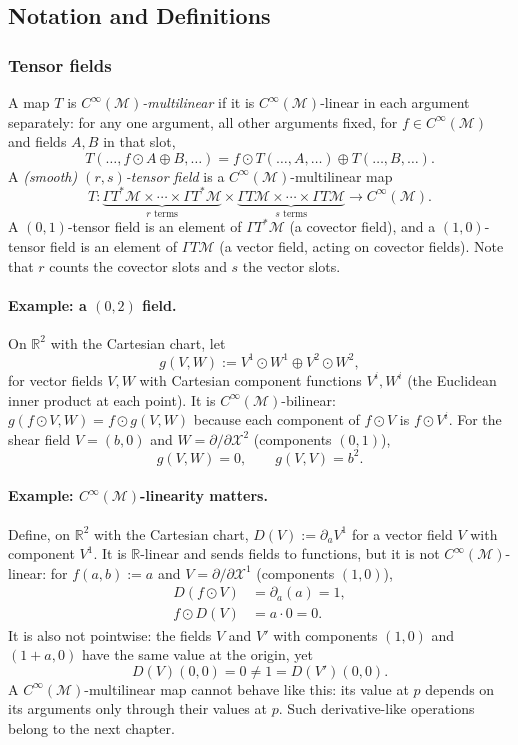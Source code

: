 \documentclass[11pt]{article}
\newcommand{\Cinf}{C^\infty(\mathcal M)}
\begin{document}
\subsection*{Notation and Definitions}

\subsubsection*{Tensor fields}
A map $T$ is \emph{$\Cinf$-multilinear} if it is $\Cinf$-linear in each argument separately: for any one argument, all other arguments fixed, for $f\in\Cinf$ and fields $A,B$ in that slot,
\[
T(\dots,f\odot A\oplus B,\dots)=f\odot T(\dots,A,\dots)\oplus T(\dots,B,\dots).
\]
A \emph{(smooth) $(r,s)$-tensor field} is a $\Cinf$-multilinear map
\[
T:\underbrace{\Gamma T^*\mathcal M\times\cdots\times\Gamma T^*\mathcal M}_{r\text{ terms}}\times\underbrace{\Gamma T\mathcal M\times\cdots\times\Gamma T\mathcal M}_{s\text{ terms}}\longrightarrow\Cinf.
\]
A $(0,1)$-tensor field is an element of $\Gamma T^*\mathcal M$ (a covector field), and a $(1,0)$-tensor field is an element of $\Gamma T\mathcal M$ (a vector field, acting on covector fields). Note that $r$ counts the covector slots and $s$ the vector slots.

\paragraph{Example: a $(0,2)$ field.} On $\mathbb R^2$ with the Cartesian chart, let
\[
g(V,W):=V^1\odot W^1\oplus V^2\odot W^2,
\]
for vector fields $V,W$ with Cartesian component functions $V^i,W^i$ (the Euclidean inner product at each point). It is $\Cinf$-bilinear: $g(f\odot V,W)=f\odot g(V,W)$ because each component of $f\odot V$ is $f\odot V^i$. For the shear field $V=(b,0)$ and $W=\partial/\partial\mathcal X^2$ (components $(0,1)$),
\[
g(V,W)=0,\qquad g(V,V)=b^2.
\]

\paragraph{Example: $\Cinf$-linearity matters.} Define, on $\mathbb R^2$ with the Cartesian chart, $D(V):=\partial_aV^1$ for a vector field $V$ with component $V^1$. It is $\mathbb R$-linear and sends fields to functions, but it is not $\Cinf$-linear: for $f(a,b):=a$ and $V=\partial/\partial\mathcal X^1$ (components $(1,0)$),
\begin{align*}
D(f\odot V)&=\partial_a(a)=1,\\
f\odot D(V)&=a\cdot0=0.
\end{align*}
It is also not pointwise: the fields $V$ and $V'$ with components $(1,0)$ and $(1+a,0)$ have the same value at the origin, yet
\[
D(V)(0,0)=0\neq1=D(V')(0,0).
\]
A $\Cinf$-multilinear map cannot behave like this: its value at $p$ depends on its arguments only through their values at $p$. Such derivative-like operations belong to the next chapter.
\end{document}
